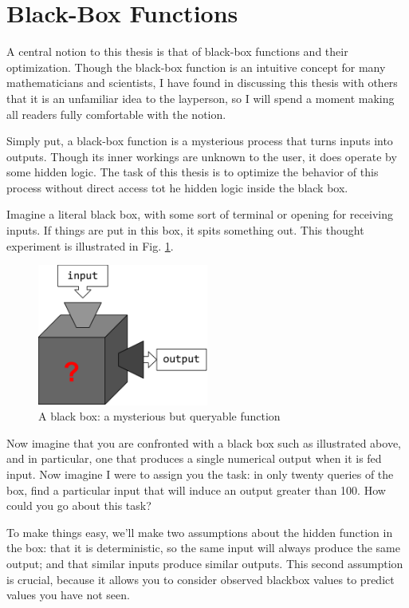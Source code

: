 \section{Black-Box Functions}
A central notion to this thesis is that of black-box functions and their optimization. Though the black-box function is an intuitive concept for many mathematicians and scientists, I have found in discussing this thesis with others that it is an unfamiliar idea to the layperson, so I will spend a moment making all readers fully comfortable with the notion.

Simply put, a black-box function is a mysterious process that turns inputs into outputs. Though its inner workings are unknown to the user, it does operate by some hidden logic. The task of this thesis is to optimize the behavior of this process without direct access tot he hidden logic inside the black box.

Imagine a literal black box, with some sort of terminal or opening for receiving inputs. If things are put in this box, it spits something out. This thought experiment is illustrated in Fig. \ref{fig:black_box}.

\begin{figure}[h]
	\centering
	\includegraphics[width=0.5\textwidth]{images/blackbox}
	\caption{A black box: a mysterious but queryable function}
	\label{fig:black_box}

\end{figure}

Now imagine that you are confronted with a black box such as illustrated above, and in particular, one that produces a single numerical output when it is fed input. Now imagine I were to assign you the task: in only twenty queries of the box, find a particular input that will induce an output greater than 100. How could you go about this task?

To make things easy, we'll make two assumptions about the hidden function in the box: that it is deterministic, so the same input will always produce the same output; and that similar inputs produce similar outputs. This second assumption is crucial, because it allows you to consider observed blackbox values to predict values you have not seen.

